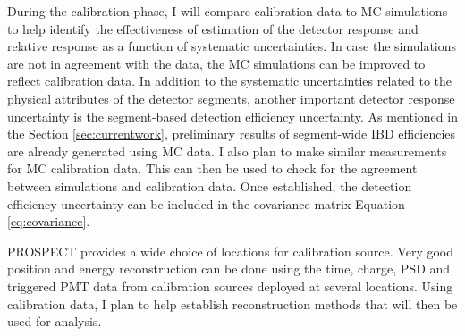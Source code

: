 \documentclass[11pt]{article}
\numberwithin{equation}{section}
\begin{document}
During the calibration phase, I will compare calibration data to MC simulations to help identify the effectiveness of estimation of the detector response and relative response as a function of systematic uncertainties. In case the simulations are not in agreement with the data, the MC simulations can be improved to reflect calibration data. In addition to the systematic uncertainties related to the physical attributes of the detector segments, another important detector response uncertainty is the segment-based detection efficiency uncertainty. As mentioned in the Section \ref{sec:currentwork}, preliminary results of segment-wide IBD efficiencies are already generated using MC data. I also plan to make similar measurements for MC calibration data. This can then be used to check for the  agreement between simulations and calibration data. Once established, the detection efficiency uncertainty can be included in the covariance matrix Equation \ref{eq:covariance}. 

PROSPECT provides a wide choice of locations for calibration source. Very good position and energy reconstruction can be done using the time, charge, PSD and triggered PMT data from calibration sources deployed at several locations. Using calibration data, I plan to help establish reconstruction methods that will then be used for analysis.
\end{document}
